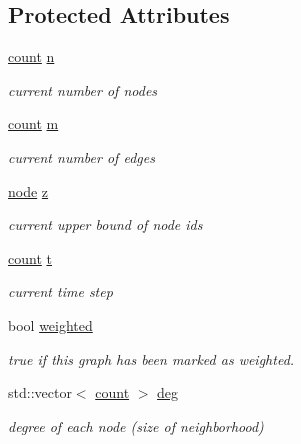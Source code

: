 \subsection*{Protected Attributes}
\begin{DoxyCompactItemize}
\item 
\hyperlink{namespace_networ_kit_a76b399edfa50ae72e4aa86007aaa800a}{count} \hyperlink{class_networ_kit_1_1_graph_aae05e611d6d5eb42e045d374d73eb34a}{n}
\begin{DoxyCompactList}\small\item\em current number of nodes \end{DoxyCompactList}\item 
\hyperlink{namespace_networ_kit_a76b399edfa50ae72e4aa86007aaa800a}{count} \hyperlink{class_networ_kit_1_1_graph_a7017e2d146dcc5dbd9120c274300a99a}{m}
\begin{DoxyCompactList}\small\item\em current number of edges \end{DoxyCompactList}\item 
\hyperlink{namespace_networ_kit_a53fe3e4fd04ea024160e4d024dfebadf}{node} \hyperlink{class_networ_kit_1_1_graph_a4e544aace8b0d5bc5821c386e0500a46}{z}
\begin{DoxyCompactList}\small\item\em current upper bound of node ids \end{DoxyCompactList}\item 
\hyperlink{namespace_networ_kit_a76b399edfa50ae72e4aa86007aaa800a}{count} \hyperlink{class_networ_kit_1_1_graph_a94f839ffb30401a9b37cdf2018c84c63}{t}
\begin{DoxyCompactList}\small\item\em current time step \end{DoxyCompactList}\item 
bool \hyperlink{class_networ_kit_1_1_graph_a9c578217708fd4f3652ea92a07dfd5be}{weighted}
\begin{DoxyCompactList}\small\item\em true if this graph has been marked as weighted. \end{DoxyCompactList}\item 
std\-::vector$<$ \hyperlink{namespace_networ_kit_a76b399edfa50ae72e4aa86007aaa800a}{count} $>$ \hyperlink{class_networ_kit_1_1_graph_a264a36a2017c51a1c3f71e7429e47b22}{deg}
\begin{DoxyCompactList}\small\item\em degree of each node (size of neighborhood) \end{DoxyCompactList}\item 

\end{DoxyCompactItemize}
